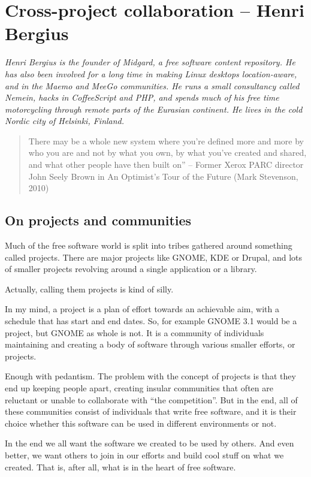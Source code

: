 \chapter{Cross-project collaboration -- Henri Bergius}

\textit{Henri Bergius is the founder of Midgard, a free software content
repository. He has also been involved for a long time in making Linux desktops
location-aware, and in the Maemo and MeeGo communities. He runs a small
consultancy called Nemein, hacks in CoffeeScript and PHP, and spends much of his
free time motorcycling through remote parts of the Eurasian continent. He lives
in the cold Nordic city of Helsinki, Finland.}

\begin{quote}
There may be a whole new system where you're defined more and more by who you
are and not by what you own, by what you've created and shared, and what other
people have then built on” -- Former Xerox PARC director John Seely Brown in An
Optimist's Tour of the Future (Mark Stevenson, 2010)
\end{quote}

\section*{On projects and communities}

Much of the free software world is split into tribes gathered around something
called projects. There are major projects like GNOME, KDE or Drupal, and lots of
smaller projects revolving around a single application or a library.

Actually, calling them projects is kind of silly.

In my mind, a project is a plan of effort towards an achievable aim, with a
schedule that has start and end dates. So, for example GNOME 3.1 would be a
project, but GNOME as whole is not. It is a community of individuals maintaining
and creating a body of software through various smaller efforts, or projects.

Enough with pedantism. The problem with the concept of projects is that they end
up keeping people apart, creating insular communities that often are reluctant
or unable to collaborate with ``the competition''. But in the end, all of these
communities consist of individuals that write free software, and it is their
choice whether this software can be used in different environments or not.

In the end we all want the software we created to be used by others. And even
better, we want others to join in our efforts and build cool stuff on what we
created. That is, after all, what is in the heart of free software.

